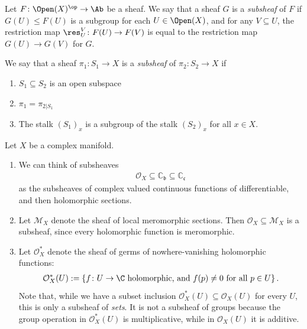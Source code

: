 \documentclass[11pt]{amsart}
\begin{document}
\begin{definition}[Subsheaf] Let $F \colon \Open(X)^\op \to \Ab$ be a sheaf. We say that a sheaf $G$ is a \emph{subsheaf} of $F$ if $G(U) \le F(U)$ is a subgroup for each $U\in \Open(X)$, and for any $V \subseteq U$, the restriction map $\res_U^V \colon F(U) \to F(V)$ is equal to the restriction map $G(U)\to G(V)$ for $G$.
\end{definition}

\begin{definition} We say that a sheaf $\pi_1 \colon S_1 \to X$ is a \emph{subsheaf} of $\pi_2 \colon S_2 \to X$ if
\begin{enumerate}
    \item $S_1 \subseteq S_2$ is an open subspace
    \item $\pi_1 = \pi_{2 | S_1}$
    \item The stalk $(S_1)_x$ is a subgroup of the stalk $(S_2)_x$ for all $x\in X$.
\end{enumerate}
\end{definition}

\begin{example}\label{exa:subsheaves-examples} Let $X$ be a complex manifold.
\begin{enumerate}
    \item We can think of subsheaves
    \begin{align*}
        \mathcal{O}_X \subseteq \mathbb{C}_\mathfrak{b} \subseteq \mathbb{C}_\mathfrak{c}
    \end{align*}
    as the subsheaves of complex valued continuous functions of differentiable, and then holomorphic sections.
    \item Let $\mathcal{M}_X$ denote the sheaf of local meromorphic sections. Then $\mathcal{O}_X \subseteq \mathcal{M}_X$ is a subsheaf, since every holomorphic function is meromorphic.

    \item Let $\mathcal{O}_X^\ast$ denote the sheaf of germs of nowhere-vanishing holomorphic functions:
    \begin{align*}
        \mathcal{O}_X^\ast(U) := \left\{ f \colon U \to \C \text{ holomorphic, and } f(p)\ne 0 \text{ for all } p\in U \right\}.
    \end{align*}
    Note that, while we have a subset inclusion $\mathcal{O}_X^\ast(U) \subseteq \mathcal{O}_X(U)$ for every $U$, this is only a subsheaf of \emph{sets}. It is not a subsheaf of groups because the group operation in $\mathcal{O}_X^\ast(U)$ is multiplicative, while in $\mathcal{O}_X(U)$ it is additive.
\end{enumerate}
\end{example}
\end{document}

